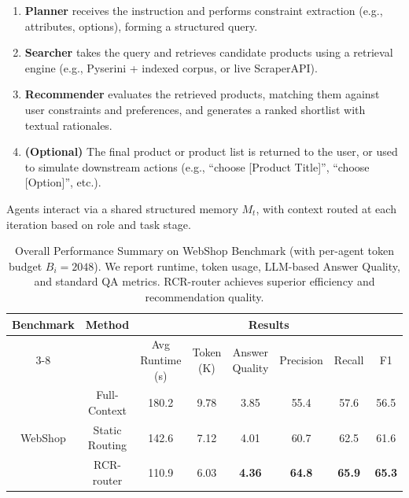 \begin{enumerate}
    \item \textbf{Planner} receives the instruction and performs constraint extraction (e.g., attributes, options), forming a structured query.
    
    \item \textbf{Searcher} takes the query and retrieves candidate products using a retrieval engine (e.g., Pyserini + indexed corpus, or live ScraperAPI).
    
    \item \textbf{Recommender} evaluates the retrieved products, matching them against user constraints and preferences, and generates a ranked shortlist with textual rationales.
    
    \item \textbf{(Optional)} The final product or product list is returned to the user, or used to simulate downstream actions (e.g., “choose [Product Title]”, “choose [Option]”, etc.).
\end{enumerate}

Agents interact via a shared structured memory $M_t$, with context routed at each iteration based on role and task stage.

\begin{table}[t]
\centering
\caption{Overall Performance Summary on WebShop Benchmark (with per-agent token budget $B_i = 2048$). We report runtime, token usage, LLM-based Answer Quality, and standard QA metrics. RCR-router achieves superior efficiency and recommendation quality.}
\label{tab:webshop_results}
\begin{tabular}{c|c|c|c|c|c|c|c}
\toprule
\multirow{2}{*}{\textbf{Benchmark}} & \multirow{2}{*}{\textbf{Method}} & \multicolumn{6}{c}{\textbf{Results}} \\
\cline{3-8}
& & Avg Runtime (s) & Token (K) & Answer Quality & Precision & Recall & F1 \\
\midrule
\multirow{3}{*}{WebShop} 
& Full-Context    & 180.2 & 9.78 & 3.85 & 55.4 & 57.6 & 56.5 \\
& Static Routing  & 142.6 & 7.12 & 4.01 & 60.7 & 62.5 & 61.6 \\
& RCR-router      & 110.9 & 6.03 & \textbf{4.36} & \textbf{64.8} & \textbf{65.9} & \textbf{65.3} \\
\bottomrule
\end{tabular}
\end{table}

